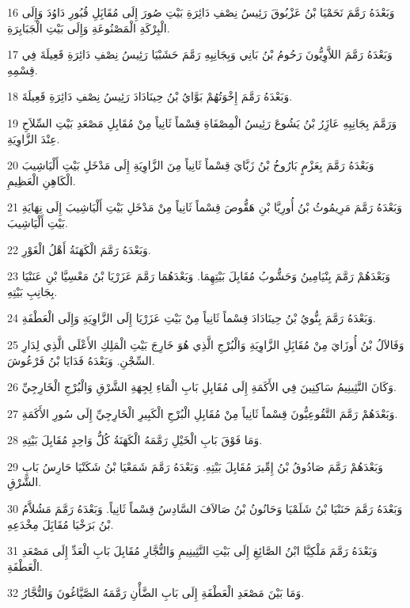 \par 16 وَبَعْدَهُ رَمَّمَ نَحَمْيَا بْنُ عَزْبُوقَ رَئِيسُ نِصْفِ دَائِرَةِ بَيْتِ صُورَ إِلَى مُقَابَِلِ قُبُورِ دَاوُدَ وَإِلَى الْبِرْكَةِ الْمَصْنُوعَةِ وَإِلَى بَيْتِ الْجَبَابِرَةِ.
\par 17 وَبَعْدَهُ رَمَّمَ اللاَّوِيُّونَ رَحُومُ بْنُ بَانِي وَبِجَانِبِهِ رَمَّمَ حَشَبْيَا رَئِيسُ نِصْفِ دَائِرَةِ قَعِيلَةَ فِي قِسْمِهِ.
\par 18 وَبَعْدَهُ رَمَّمَ إِخْوَتُهُمْ بَوَّايُ بْنُ حِينَادَادَ رَئِيسُ نِصْفِ دَائِرَةِ قَعِيلَةَ.
\par 19 وَرَمَّمَ بِجَانِبِهِ عَازَِرُ بْنُ يَشُوعَ رَئِيسُ الْمِصْفَاةِ قِسْماً ثَانِياً مِنْ مُقَابِلِ مَصْعَدِ بَيْتِ السِّلاَحِ عِنْدَ الزَّاوِيَةِ.
\par 20 وَبَعْدَهُ رَمَّمَ بِعَزْمٍ بَارُوخُ بْنُ زَبَّايَ قِسْماً ثَانِياً مِنَ الزَّاوِيَةِ إِلَى مَدْخَلِ بَيْتِ أَلْيَاشِيبَ الْكَاهِنِ الْعَظِيمِ.
\par 21 وَبَعْدَهُ رَمَّمَ مَرِيمُوثُ بْنُ أُورِيَّا بْنِ هَقُّوصَ قِسْماً ثَانِياً مِنْ مَدْخَلِ بَيْتِ أَلْيَاشِيبَ إِلَى نِهَايَةِ بَيْتِ أَلْيَاشِيبَ.
\par 22 وَبَعْدَهُ رَمَّمَ الْكَهَنَةُ أَهْلُ الْغَوْرِ.
\par 23 وَبَعْدَهُمْ رَمَّمَ بِنْيَامِينُ وَحَشُّوبُ مُقَابِلَ بَيْتِهِمَا. وَبَعْدَهُمَا رَمَّمَ عَزَرْيَا بْنُ مَعْسِيَّا بْنِ عَنَنْيَا بِجَانِبِ بَيْتِهِ.
\par 24 وَبَعْدَهُ رَمَّمَ بِنُّويُ بْنُ حِينَادَادَ قِسْماً ثَانِياً مِنْ بَيْتِ عَزَرْيَا إِلَى الزَّاوِيَةِ وَإِلَى الْعَطْفَةِ.
\par 25 وَفَالاَلُ بْنُ أُوزَايَ مِنْ مُقَابَِلِ الزَّاوِيَةِ وَالْبُرْجِ الَّذِي هُوَ خَارِجَ بَيْتِ الْمَلِكِ الأَعْلَى الَّذِي لِدَارِ السِّجْنِ. وَبَعْدَهُ فَدَايَا بْنُ فَرْعُوشَ.
\par 26 وَكَانَ النَّثِينِيمُ سَاكِنِينَ فِي الأَكَمَةِ إِلَى مُقَابِلِ بَابِ الْمَاءِ لِجِهَةِ الشَّرْقِ وَالْبُرْجِ الْخَارِجِيِّ.
\par 27 وَبَعْدَهُمْ رَمَّمَ التَّقُوعِيُّونَ قِسْماً ثَانِياً مِنْ مُقَابِلِ الْبُرْجِ الْكَبِيرِ الْخَارِجِيِّ إِلَى سُورِ الأَكَمَةِ.
\par 28 وَمَا فَوْقَ بَابِ الْخَيْلِ رَمَّمَهُ الْكَهَنَةُ كُلُّ وَاحِدٍ مُقَابِلَ بَيْتِهِ.
\par 29 وَبَعْدَهُمْ رَمَّمَ صَادُوقُ بْنُ إِمِّيرَ مُقَابِلَ بَيْتِهِ. وَبَعْدَهُ رَمَّمَ شَمَعْيَا بْنُ شَكَنْيَا حَارِسُ بَابِ الشَّرْقِ.
\par 30 وَبَعْدَهُ رَمَّمَ حَنَنْيَا بْنُ شَلَمْيَا وَحَانُونُ بْنُ صَالاَفَ السَّادِسُ قِسْماً ثَانِياً. وَبَعْدَهُ رَمَّمَ مَشُلاَّمُ بْنُ بَرَخْيَا مُقَابَِلَ مِخْدَعِهِ.
\par 31 وَبَعْدَهُ رَمَّمَ مَلْكِيَّا ابْنُ الصَّائِغِ إِلَى بَيْتِ النَّثِينِيمِ وَالتُّجَّارِ مُقَابِلَ بَابِ الْعَدِّ إِلَى مَصْعَدِ الْعَطْفَةِ.
\par 32 وَمَا بَيْنَ مَصْعَدِ الْعَطْفَةِ إِلَى بَابِ الضَّأْنِ رَمَّمَهُ الصَّيَّاغُونَ وَالتُّجَّارُ.

